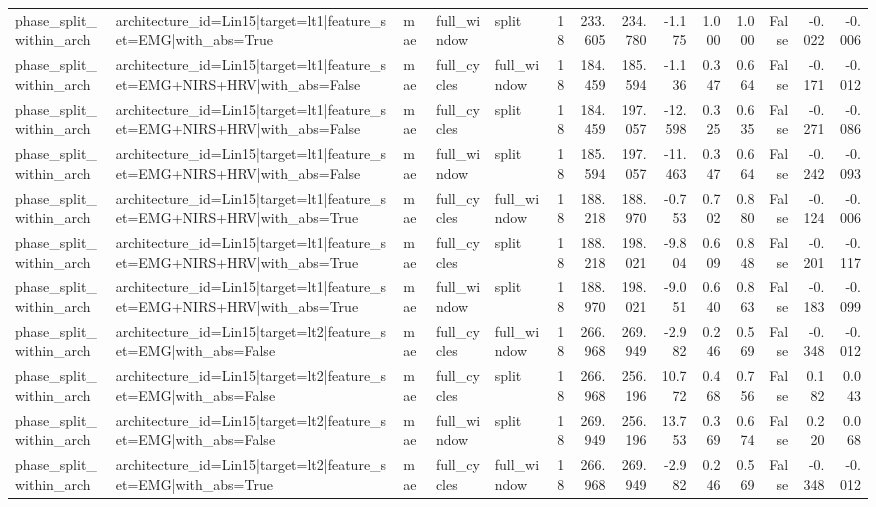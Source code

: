\begin{table}
\begin{tabular}{lllllrrrrrrrrr}
phase_split_within_arch & architecture_id=Lin15|target=lt1|feature_set=EMG|with_abs=True & mae & full_window & split & 18 & 233.605 & 234.780 & -1.175 & 1.000 & 1.000 & False & -0.022 & -0.006 \\
phase_split_within_arch & architecture_id=Lin15|target=lt1|feature_set=EMG+NIRS+HRV|with_abs=False & mae & full_cycles & full_window & 18 & 184.459 & 185.594 & -1.136 & 0.347 & 0.664 & False & -0.171 & -0.012 \\
phase_split_within_arch & architecture_id=Lin15|target=lt1|feature_set=EMG+NIRS+HRV|with_abs=False & mae & full_cycles & split & 18 & 184.459 & 197.057 & -12.598 & 0.325 & 0.635 & False & -0.271 & -0.086 \\
phase_split_within_arch & architecture_id=Lin15|target=lt1|feature_set=EMG+NIRS+HRV|with_abs=False & mae & full_window & split & 18 & 185.594 & 197.057 & -11.463 & 0.347 & 0.664 & False & -0.242 & -0.093 \\
phase_split_within_arch & architecture_id=Lin15|target=lt1|feature_set=EMG+NIRS+HRV|with_abs=True & mae & full_cycles & full_window & 18 & 188.218 & 188.970 & -0.753 & 0.702 & 0.880 & False & -0.124 & -0.006 \\
phase_split_within_arch & architecture_id=Lin15|target=lt1|feature_set=EMG+NIRS+HRV|with_abs=True & mae & full_cycles & split & 18 & 188.218 & 198.021 & -9.804 & 0.609 & 0.848 & False & -0.201 & -0.117 \\
phase_split_within_arch & architecture_id=Lin15|target=lt1|feature_set=EMG+NIRS+HRV|with_abs=True & mae & full_window & split & 18 & 188.970 & 198.021 & -9.051 & 0.640 & 0.863 & False & -0.183 & -0.099 \\
phase_split_within_arch & architecture_id=Lin15|target=lt2|feature_set=EMG|with_abs=False & mae & full_cycles & full_window & 18 & 266.968 & 269.949 & -2.982 & 0.246 & 0.569 & False & -0.348 & -0.012 \\
phase_split_within_arch & architecture_id=Lin15|target=lt2|feature_set=EMG|with_abs=False & mae & full_cycles & split & 18 & 266.968 & 256.196 & 10.772 & 0.468 & 0.756 & False & 0.182 & 0.043 \\
phase_split_within_arch & architecture_id=Lin15|target=lt2|feature_set=EMG|with_abs=False & mae & full_window & split & 18 & 269.949 & 256.196 & 13.753 & 0.369 & 0.674 & False & 0.220 & 0.068 \\
phase_split_within_arch & architecture_id=Lin15|target=lt2|feature_set=EMG|with_abs=True & mae & full_cycles & full_window & 18 & 266.968 & 269.949 & -2.982 & 0.246 & 0.569 & False & -0.348 & -0.012 \\

\end{tabular}
\end{table}
